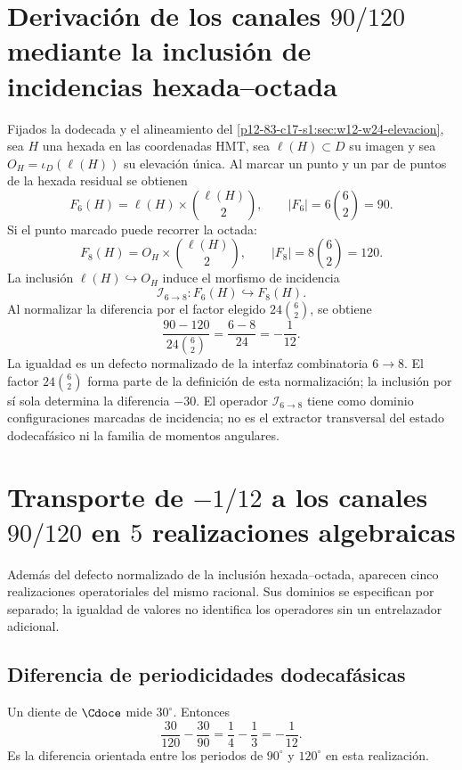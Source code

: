 \label{chap:83-14}

\section{Derivación de los canales \(90/120\) mediante la inclusión de incidencias hexada--octada}

Fijados la dodecada y el alineamiento del
\cref{p12-83-c17-s1:sec:w12-w24-elevacion}, sea \(H\) una hexada en las coordenadas HMT,
sea \(\ell(H)\subset D\) su imagen y sea
\(O_H=\iota_D(\ell(H))\) su elevación única. Al marcar un punto
y un par de puntos de la hexada residual se obtienen
\[
F_6(H)=\ell(H)\times\binom{\ell(H)}2,
\qquad
|F_6|=6\binom62=90.
\]
Si el punto marcado puede recorrer la octada:
\[
F_8(H)=O_H\times\binom{\ell(H)}2,
\qquad
|F_8|=8\binom62=120.
\]
La inclusión \(\ell(H)\hookrightarrow O_H\) induce el morfismo de incidencia
\[
 \mathcal I_{6\to8}:F_6(H)\hookrightarrow F_8(H).
\]
Al normalizar la diferencia por el factor
elegido \(24\binom62\), se obtiene
\[
\boxed{
\frac{90-120}{24\binom62}
=\frac{6-8}{24}
=-\frac1{12}.}
\]
La igualdad es un defecto normalizado de la interfaz combinatoria
\(6\to8\). El factor \(24\binom62\) forma parte de la definición de esta
normalización; la inclusión por sí sola determina la diferencia \(-30\).
El operador \(\mathcal I_{6\to8}\) tiene como dominio configuraciones
marcadas de incidencia; no es el extractor transversal del estado
dodecafásico ni la familia de momentos angulares.

\section{Transporte de \(-1/12\) a los canales \(90/120\) en \(5\) realizaciones algebraicas}

Además del defecto normalizado de la inclusión hexada--octada, aparecen
cinco realizaciones operatoriales del mismo racional. Sus dominios se
especifican por separado; la igualdad de valores no identifica los
operadores sin un entrelazador adicional.

\subsection{Diferencia de periodicidades dodecafásicas}

Un diente de \(\Cdoce\) mide \(30^\circ\). Entonces
\[
\frac{30}{120}-\frac{30}{90}
=\frac14-\frac13
=-\frac1{12}.
\]
Es la diferencia orientada entre los periodos de \(90^\circ\) y
\(120^\circ\) en esta realización.

